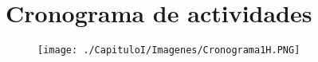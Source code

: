 
\section{Cronograma de actividades}

\begin{figure}[h]
\centering
\texttt{[image: ./CapituloI/Imagenes/Cronograma1H.PNG]}
\end{figure}